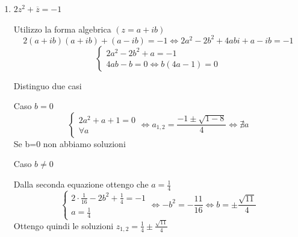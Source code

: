\documentclass{article}
\begin{document}
\begin{enumerate}[label=\textbf{Esercizio 3.\arabic*.},itemindent=*]
\begin{enumerate}
        \item $2z^2+\overline{z}=-1$
        \par Utilizzo la forma algebrica $(z=a+ib)$
        \[2(a+ib)(a+ib)+(a-ib)=-1\Leftrightarrow 2a^2-2b^2+4abi+a-ib=-1\]
        \[\begin{cases}
        2a^2-2b^2+a=-1 \\ 4ab-b=0\Leftrightarrow b(4a-1)=0
        \end{cases}\]
        
        Distinguo due casi
        
        Caso $b=0$
        \[\begin{cases}
        2a^2+a+1=0 \\ \forall a
        \end{cases} \Leftrightarrow a_{1,2}=\frac{-1\pm\sqrt{1-8}}{4}\Leftrightarrow\nexists a\]
         Se b=0 non abbiamo soluzioni
        
        \par Caso $b\neq0$
        \par Dalla seconda equazione ottengo che $a=\frac{1}{4}$
        \[\begin{cases}
        2\cdot{\frac{1}{16}}-2b^2+\frac{1}{4}=-1 \\ a=\frac{1}{4}
        \end{cases}\Leftrightarrow -b^2=-\frac{11}{16}\Leftrightarrow b=\pm \frac{\sqrt{11}}{4}\]
         Ottengo quindi le soluzioni $z_{1,2}=\frac{1}{4}\pm\frac{\sqrt{11}}{4}$
    
    \end{enumerate}
    

\end{enumerate}
\end{document}
